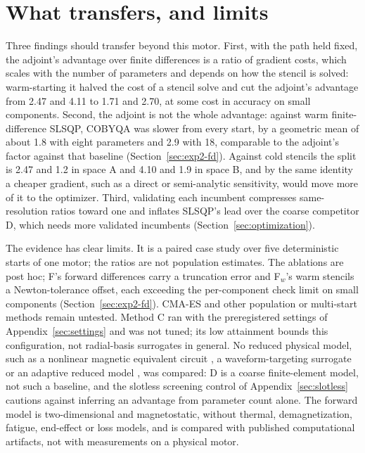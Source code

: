 \documentclass{anvil-paper}
\begin{document}
\section{What transfers, and limits}\label{sec:discussion}
Three findings should transfer beyond this motor. First, with the path
held fixed, the adjoint's advantage over finite differences is a ratio of
gradient costs, which scales with the number of parameters and depends on
how the stencil is solved: warm-starting it halved the cost of a stencil
solve and cut the adjoint's advantage from 2.47 and 4.11 to 1.71 and 2.70,
at some cost in accuracy on small components. Second,
the adjoint is not the whole advantage: against warm finite-difference
SLSQP, COBYQA was slower from every start, by a geometric mean of about 1.8
with eight parameters and 2.9 with 18, comparable to the adjoint's factor
against that baseline (Section~\ref{sec:exp2-fd}). Against cold
stencils the split is 2.47 and 1.2 in space A and 4.10 and 1.9 in space B,
and by the same identity a cheaper gradient, such as a direct or
semi-analytic sensitivity, would move more of it to the optimizer. Third, validating
each incumbent compresses same-resolution ratios toward one and inflates
SLSQP's lead over the coarse competitor D, which needs more validated
incumbents (Section~\ref{sec:optimization}).

The evidence has clear limits. It is a paired case study over five
deterministic starts of one motor; the ratios are not population estimates.
The ablations are post hoc; F's forward differences carry a truncation
error and F$_w$'s warm stencils a Newton-tolerance offset, each exceeding the
per-component check limit on small components (Section~\ref{sec:exp2-fd}). CMA-ES and other population or
multi-start methods remain untested.
Method C ran with the preregistered settings of
Appendix~\ref{sec:settings} and was not tuned; its low attainment bounds
this configuration, not radial-basis surrogates in general. No reduced
physical model, such as a nonlinear magnetic equivalent circuit
\citep{kemmetmueller2015}, a waveform-targeting surrogate \citep{roomi2022}
or an adaptive reduced model \citep{wen2023}, was compared: D is a coarse finite-element model, not such a baseline, and
the slotless screening control of Appendix~\ref{sec:slotless} cautions
against inferring an advantage from parameter count alone. The forward model is two-dimensional and
magnetostatic, without thermal, demagnetization, fatigue, end-effect or
loss models, and is compared with published computational artifacts, not
with measurements on a physical motor.
\end{document}
